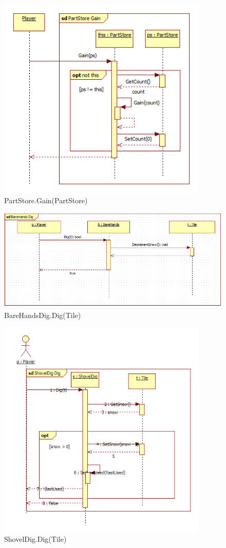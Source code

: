 \begin{figure}[H]
	\begin{center}
		\includegraphics[width=10cm]{chapters/chapter04/seqdiag/PartStore_Gain.png}
		\caption{PartStore.Gain(PartStore)}
		\label{fig:PartStoreGain}
	\end{center}
\end{figure}
\begin{figure}[H]
	\begin{center}
		\includegraphics[width=15cm]{chapters/chapter04/seqdiag/BareHandsDig_Dig.png}
		\caption{BareHandsDig.Dig(Tile)}
		\label{fig:BareHandsDig.Dig}
	\end{center}
\end{figure}
\begin{figure}[H]
	\begin{center}
		\includegraphics[width=10cm]{chapters/chapter04/seqdiag/ShovelDig_Dig.png}
		\caption{ShovelDig.Dig(Tile)}
		\label{fig:ShovelDigDig}
	\end{center}
\end{figure}
